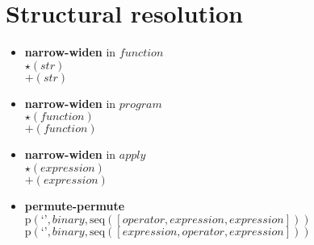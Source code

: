 \section{Structural resolution}
{\footnotesize\begin{itemize}
\item \textbf{narrow-widen}  in $\mathit{function}$\\$\star \left(str\right)$\\$\plus \left(str\right)$
\item \textbf{narrow-widen}  in $\mathit{program}$\\$\star \left(\mathit{function}\right)$\\$\plus \left(\mathit{function}\right)$
\item \textbf{narrow-widen}  in $\mathit{apply}$\\$\star \left(\mathit{expression}\right)$\\$\plus \left(\mathit{expression}\right)$
\item \textbf{permute-permute}\\$\mathrm{p}\left(\text{`'},\mathit{binary},\mathrm{seq}\left(\left[\mathit{operator}, \mathit{expression}, \mathit{expression}\right]\right)\right)$\\$\mathrm{p}\left(\text{`'},\mathit{binary},\mathrm{seq}\left(\left[\mathit{expression}, \mathit{operator}, \mathit{expression}\right]\right)\right)$
\end{itemize}}
